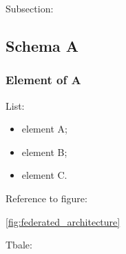 Subsection:

\subsection{Schema A}

\subsubsection{Element of A}

List:

\begin{itemize}
  \setlength{\itemsep}{2pt}
  \setlength{\parskip}{2pt}
  \item element A;
  \item element B;
  \item element C.
\end{itemize}


Reference to figure:

\ref{fig:federated_architecture}

Tbale:

